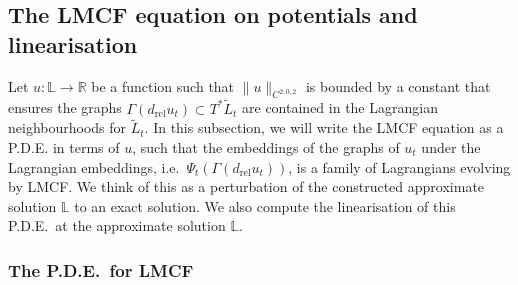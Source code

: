 \documentclass[10pt, a4paper]{article}
\theoremstyle{plain}%
\theoremstyle{definition}
\numberwithin{figure}{section}
\numberwithin{equation}{section}
\newcommand{\bL}{\mathbb{L}}
\newcommand{\bR}{\mathbb{R}}
\newcommand{\rt}{\rightarrow}
\newcommand{\tL}{\widetilde{L}}
\newcommand{\rel}{\mathrm{rel}}
\begin{document}
\subsection{The LMCF equation on potentials and linearisation}
Let $u  : \bL\rt\bR$ be a function such that $\|u\|_{C^{2,0,2}}$ is bounded by a constant that ensures the graphs $\Gamma(d_{\mathrm{rel}}u_t)\subset T^*\tL_t$ are contained in the Lagrangian neighbourhoods for $\tL_t$. In this subsection, we will write the LMCF equation as a P.D.E. in terms of $u$, such that the embeddings of the graphs of $u_t$ under the Lagrangian embeddings, i.e.\ $\Psi_t(\Gamma(d_\rel u_t))$, is a family of Lagrangians evolving by LMCF. We think of this as a perturbation of the constructed approximate solution $\bL$ to an exact solution. We also compute the linearisation of this P.D.E.\ at the approximate solution $\bL$.

\subsubsection{The P.D.E.\ for LMCF}
\end{document}
